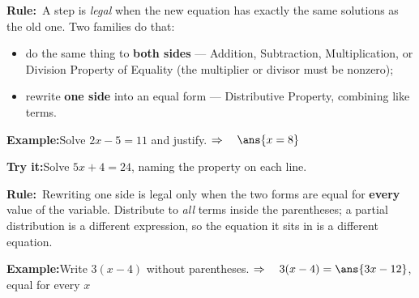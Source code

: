 \documentclass[12pt]{article}
\begin{document}


\begin{formulabox}\textbf{Rule:}\ A step is \emph{legal} when the new equation
has exactly the same solutions as the old one. Two families do that:
\begin{itemize}[leftmargin=0.8cm, itemsep=1pt, topsep=2pt]
  \item do the same thing to \textbf{both sides} --- Addition, Subtraction,
        Multiplication, or Division Property of Equality (the multiplier or
        divisor must be nonzero);
  \item rewrite \textbf{one side} into an equal form --- Distributive Property,
        combining like terms.
\end{itemize}
\end{formulabox}

\begin{examplebox}\textbf{Example:}\quad Solve $2x - 5 = 11$ and justify.
$\Rightarrow\quad \ans{x = 8}$
\end{examplebox}

\begin{tryitbox}\textbf{Try it:}\quad Solve $5x + 4 = 24$, naming the property
on each line.\\[2pt]
\end{tryitbox}


\begin{formulabox}\textbf{Rule:}\ Rewriting one side is legal only when the two
forms are equal for \textbf{every} value of the variable. Distribute to
\emph{all} terms inside the parentheses; a partial distribution is a different
expression, so the equation it sits in is a different equation.
\end{formulabox}

\begin{examplebox}\textbf{Example:}\quad Write $3(x-4)$ without parentheses.
$\Rightarrow\quad 3(x-4) = \ans{3x-12}$, equal for every $x$
\end{examplebox}
\end{document}

